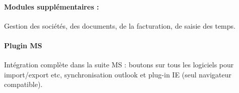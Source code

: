 \paragraph{Modules supplémentaires :} Gestion des sociétés, des documents, de la facturation, de saisie des temps.

\paragraph{Plugin MS} Intégration complète dans la suite MS : boutons sur tous les logiciels pour import/export etc, synchronisation outlook et plug-in IE (seul navigateur compatible).
